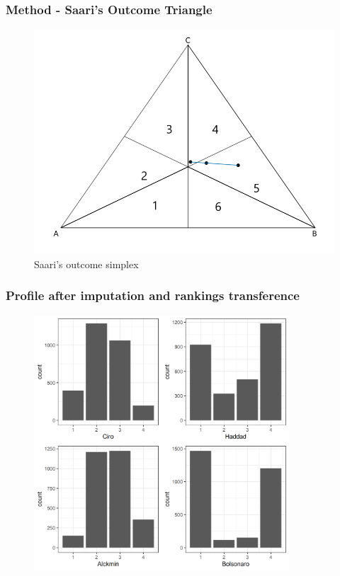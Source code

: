 \documentclass{beamer}
\begin{document}
\begin{frame}
  \frametitle{Method - Saari's Outcome Triangle}
\begin{figure}[H] \centering \includegraphics[width=\textwidth]{../images/simpletriangle.png}
 \caption{Saari's outcome simplex}
 \label{fig:saari_nurmi}
\end{figure}
\end{frame}


\begin{frame}
  \frametitle{Profile after imputation and rankings transference}
\begin{figure}[!h] \centering

\includegraphics[width=0.85\textwidth, height = 0.85\textheight]{../images/corrected1_indexes_plot.png}



\end{figure}
\end{frame}
\end{document}

